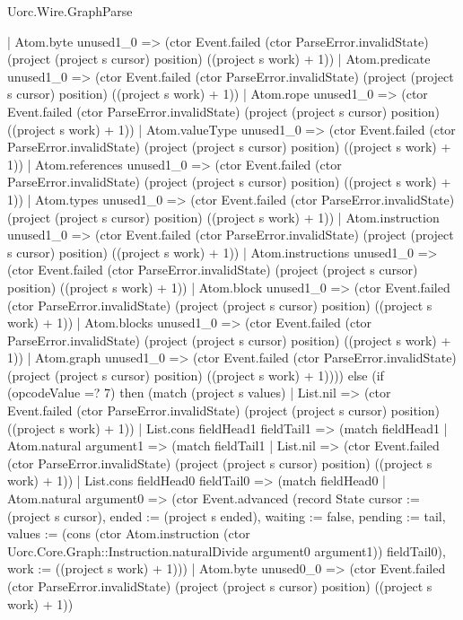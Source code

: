 \begin{lexlean}{Uorc.Wire.GraphParse}
\begin{semanticmodule}
{          | Atom.byte unused1_0 => (ctor Event.failed (ctor ParseError.invalidState) (project (project s cursor) position) ((project s work) + 1))
          | Atom.predicate unused1_0 => (ctor Event.failed (ctor ParseError.invalidState) (project (project s cursor) position) ((project s work) + 1))
          | Atom.rope unused1_0 => (ctor Event.failed (ctor ParseError.invalidState) (project (project s cursor) position) ((project s work) + 1))
          | Atom.valueType unused1_0 => (ctor Event.failed (ctor ParseError.invalidState) (project (project s cursor) position) ((project s work) + 1))
          | Atom.references unused1_0 => (ctor Event.failed (ctor ParseError.invalidState) (project (project s cursor) position) ((project s work) + 1))
          | Atom.types unused1_0 => (ctor Event.failed (ctor ParseError.invalidState) (project (project s cursor) position) ((project s work) + 1))
          | Atom.instruction unused1_0 => (ctor Event.failed (ctor ParseError.invalidState) (project (project s cursor) position) ((project s work) + 1))
          | Atom.instructions unused1_0 => (ctor Event.failed (ctor ParseError.invalidState) (project (project s cursor) position) ((project s work) + 1))
          | Atom.block unused1_0 => (ctor Event.failed (ctor ParseError.invalidState) (project (project s cursor) position) ((project s work) + 1))
          | Atom.blocks unused1_0 => (ctor Event.failed (ctor ParseError.invalidState) (project (project s cursor) position) ((project s work) + 1))
          | Atom.graph unused1_0 => (ctor Event.failed (ctor ParseError.invalidState) (project (project s cursor) position) ((project s work) + 1)))) else (if (opcodeValue =? 7) then (match (project s values)
        | List.nil => (ctor Event.failed (ctor ParseError.invalidState) (project (project s cursor) position) ((project s work) + 1))
        | List.cons fieldHead1 fieldTail1 => (match fieldHead1
          | Atom.natural argument1 => (match fieldTail1
            | List.nil => (ctor Event.failed (ctor ParseError.invalidState) (project (project s cursor) position) ((project s work) + 1))
            | List.cons fieldHead0 fieldTail0 => (match fieldHead0
              | Atom.natural argument0 => (ctor Event.advanced (record State {cursor := (project s cursor), ended := (project s ended), waiting := false, pending := tail, values := (cons (ctor Atom.instruction (ctor Uorc.Core.Graph::Instruction.naturalDivide argument0 argument1)) fieldTail0), work := ((project s work) + 1)}))
              | Atom.byte unused0_0 => (ctor Event.failed (ctor ParseError.invalidState) (project (project s cursor) position) ((project s work) + 1))
}
\end{semanticmodule}
\end{lexlean}
